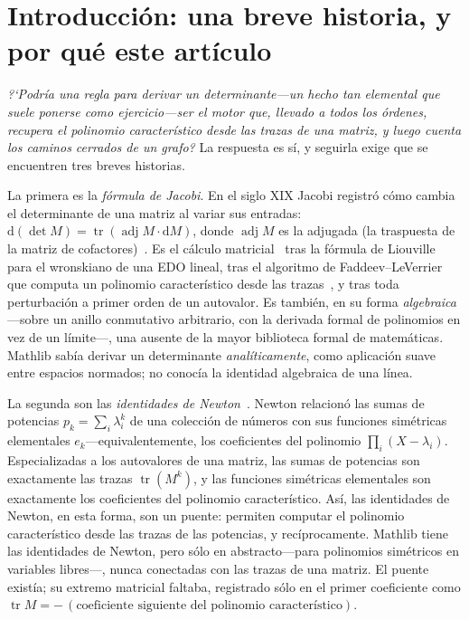 \documentclass[11pt]{article}
\newcommand{\tr}{\operatorname{tr}}
\newcommand{\adj}{\operatorname{adj}}
\begin{document}
\section{Introducci\'on: una breve historia, y por qu\'e este art\'iculo}
\label{sec:intro}

\emph{?`Podr\'ia una regla para derivar un determinante---un hecho tan elemental que suele ponerse
como ejercicio---ser el motor que, llevado a todos los \'ordenes, recupera el polinomio
caracter\'istico desde las trazas de una matriz, y luego cuenta los caminos cerrados de un grafo?} La
respuesta es s\'i, y seguirla exige que se encuentren tres breves historias.

La primera es la \emph{f\'ormula de Jacobi}. En el siglo XIX Jacobi registr\'o c\'omo cambia el
determinante de una matriz al variar sus entradas: $\mathrm{d}(\det M)=\tr(\adj M\cdot\mathrm{d}M)$,
donde $\adj M$ es la adjugada (la traspuesta de la matriz de cofactores)~\cite{HornJohnson}. Es el
c\'alculo matricial~\cite{MagnusNeudecker} tras la f\'ormula de Liouville para el wronskiano de una EDO
lineal, tras el algoritmo de Faddeev--LeVerrier que computa un polinomio caracter\'istico desde las
trazas~\cite{Hou1998}, y tras toda perturbaci\'on a primer orden de un autovalor. Es tambi\'en, en su forma \emph{algebraica}---sobre un
anillo conmutativo arbitrario, con la derivada formal de polinomios en vez de un l\'imite---, una
ausente de la mayor biblioteca formal de matem\'aticas. Mathlib sab\'ia derivar un determinante
\emph{anal\'iticamente}, como aplicaci\'on suave entre espacios normados; no conoc\'ia la identidad
algebraica de una l\'inea.

La segunda son las \emph{identidades de Newton}~\cite{Macdonald}. Newton relacion\'o las sumas de potencias
$p_k=\sum_i\lambda_i^k$ de una colecci\'on de n\'umeros con sus funciones sim\'etricas elementales
$e_k$---equivalentemente, los coeficientes del polinomio $\prod_i(X-\lambda_i)$. Especializadas a los
autovalores de una matriz, las sumas de potencias son exactamente las trazas $\tr(M^k)$, y las
funciones sim\'etricas elementales son exactamente los coeficientes del polinomio caracter\'istico.
As\'i, las identidades de Newton, en esta forma, son un puente: permiten computar el polinomio
caracter\'istico desde las trazas de las potencias, y rec\'iprocamente. Mathlib tiene las identidades
de Newton, pero s\'olo en abstracto---para polinomios sim\'etricos en variables libres---, nunca
conectadas con las trazas de una matriz. El puente exist\'ia; su extremo matricial faltaba, registrado
s\'olo en el primer coeficiente como $\tr M=-\,(\text{coeficiente siguiente del polinomio
caracter\'istico})$.
\end{document}
